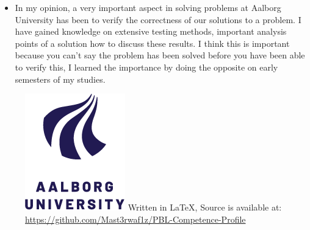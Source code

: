 \documentclass[a4paper, 14pt]{article}
\newcommand{\myitem}{\item[\color{red}\#]}
\newcommand{\highlight}[1]{\color{orange}#1\color{black}\vspace{.5pt}}
\begin{document}
    \begin{itemize}
        \myitem{} In my opinion, a very important aspect in solving problems at Aalborg University has been to \highlight{verify} the correctness of our solutions to a problem. I have gained knowledge on extensive testing methods, important analysis points of a solution how to discuss these results.
                  I think this is important because you can't say the problem has been solved before you have been able to verify this, I learned the importance by doing the opposite on early semesters of my studies.
    \end{itemize}
    \begin{figure}[b]
        \hspace{.9\textwidth}
        \includegraphics[width=.10\textwidth]{files/aaulogo.png}
        \tiny Written in \LaTeX, Source is available at: \href{https://github.com/Mast3rwaf1z/PBL-Competence-Profile}{https://github.com/Mast3rwaf1z/PBL-Competence-Profile}
    \end{figure}
\end{document}
